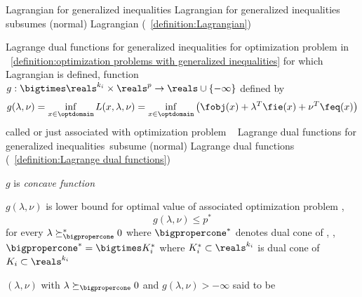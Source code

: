\documentclass[17pt,landscape]{foils}
\begin{document}
{\begin{mydefinition}{Lagrangian for generalized inequalities}
	\iitem
		Lagrangian for generalized inequalities
		{subsumes}
		(normal) Lagrangian (~\ref{definition:Lagrangian})
	\eit
\end{mydefinition}
%
%



\begin{mydefinition}{Lagrange dual functions for generalized inequalities}
	for optimization problem in ~\ref{definition:optimization problems with generalized inequalities}
	for which Lagrangian is defined,
	function $g:\bigtimes \reals^{k_i} \times \reals^p \to \reals\cup \{-\infty\}$
	defined by
	$$
		g(\lambda,\nu)
		=
		\inf_{x\in\optdomain} L(x,\lambda,\nu)
		=
		\inf_{x\in\optdomain} \left(\fobj(x) + \lambda^T \fie(x) + \nu^T \feq(x)\right)
	$$
	called
	or just
	associated with optimization problem
	\shrinkspacewithintheoremslike\
	\ibit
	\iitem
		Lagrange dual functions for generalized inequalities\
		{subsume}
		(normal) Lagrange dual functions (~\ref{definition:Lagrange dual functions})
	\eit
\end{mydefinition}
%

\shrinkspacewithintheoremslike

\bit
\item
	$g$ is \emph{concave function}

\vitem
	$g(\lambda,\nu)$
	is
	lower bound for optimal value of associated optimization problem
	\ie,
	$$
		g(\lambda,\nu) \leq p^\ast
	$$
	for every $\lambda\succeq_\bigpropercone^\ast0$
	where $\bigpropercone^\ast$ denotes dual cone of \bigpropercone,
	\ie,
	$\bigpropercone^\ast = \bigtimes K_i^\ast$
	where $K_i^\ast\subset\reals^{k_i}$ is dual cone of $K_i\subset\reals^{k_i}$\

\vitem
	$(\lambda,\nu)$
	with $\lambda\succeq_\bigpropercone 0$ and $g(\lambda,\nu)>-\infty$
	said to be 
\eit


}
\end{document}

